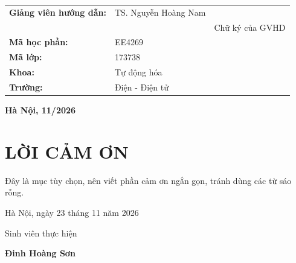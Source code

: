 \documentclass{thesis}
\begin{document}
\begin{table}[H]
  \centering
  \begin{tabular}{l l c}
    \textbf{Giảng viên hướng dẫn:}    &  TS. Nguyễn Hoàng Nam \vspace{6pt} &  \\
    &\vspace{3pt} & \fontsize{10pt}{0pt}\selectfont{} Chữ ký của GVHD \\
    \textbf{Mã học phần:} & EE4269 \vspace{3pt}\\
    \textbf{Mã lớp:} & 173738 \vspace{3pt}\\
    \textbf{Khoa:} & Tự động hóa \vspace{3pt}\\
    \textbf{Trường:} & Điện - Điện tử
  \end{tabular}
\end{table}

\begin{center}
  \vspace{48pt}
  \fontsize{14pt}{0pt}\selectfont{} \textbf{Hà Nội, 11/2026}
\end{center}

\thispagestyle{empty}
\newpage


\thispagestyle{empty}
\newpage

\section*{LỜI CẢM ƠN}
\thispagestyle{empty}
Đây là mục tùy chọn, nên viết phần cảm ơn ngắn gọn, tránh dùng các từ sáo rỗng.

\vspace{6pt}
\hspace{7cm}Hà Nội, ngày 23 tháng 11 năm 2026

\hspace{8.6cm} Sinh viên thực hiện      %

\vspace{2cm}
\hspace{9.25cm}\textbf{Đinh Hoàng Sơn} %
\end{document}
